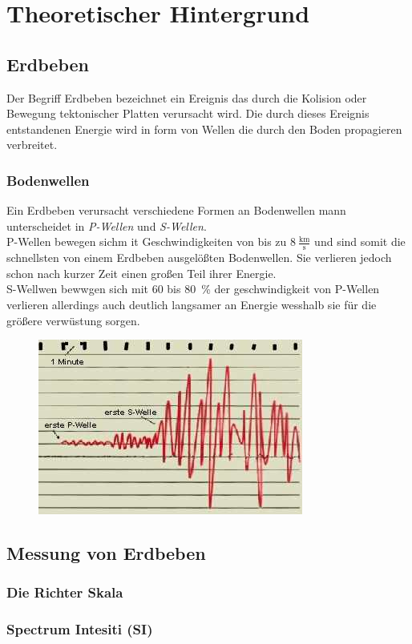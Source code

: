 \documentclass[class=scrbook, crop=false]{standalone}
\begin{document}
\ifstandalone

    
\fi

\chapter{Theoretischer Hintergrund}
\section{Erdbeben}
Der Begriff Erdbeben bezeichnet ein Ereignis das durch die Kolision oder Bewegung tektonischer Platten verursacht wird. Die durch dieses Ereignis entstandenen Energie wird in form von Wellen die durch den Boden propagieren verbreitet.
\subsection{Bodenwellen}
Ein Erdbeben verursacht verschiedene Formen an Bodenwellen mann unterscheidet in  \textit{P-Wellen} und \textit{S-Wellen}.\\
P-Wellen bewegen sichm it Geschwindigkeiten von bis zu $8~\mathrm{\frac{km}{s}}$  und sind somit die schnellsten von einem Erdbeben ausgelößten Bodenwellen. Sie verlieren jedoch schon nach kurzer Zeit einen großen Teil ihrer Energie.\\
S-Wellwen bewwgen sich mit 60 bis 80~\% der geschwindigkeit von P-Wellen verlieren allerdings auch deutlich langsamer an Energie wesshalb sie für die größere verwüstung sorgen.
\begin{figure}[h]
	\includegraphics[width=0.\textwidth]{images/theory/aufzeichnung_mechanwell_aus.jpg}

\end{figure}

\section{Messung von Erdbeben}

\subsection{Die Richter Skala}

\subsection{Spectrum Intesiti (SI)}
\end{document}
